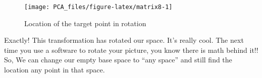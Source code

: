 \documentclass[
]{book}
\newenvironment{Shaded}{\begin{snugshade}}{\end{snugshade}}
\newcommand{\DataTypeTok}[1]{\textcolor[rgb]{0.13,0.29,0.53}{#1}}
\newcommand{\DecValTok}[1]{\textcolor[rgb]{0.00,0.00,0.81}{#1}}
\newcommand{\FloatTok}[1]{\textcolor[rgb]{0.00,0.00,0.81}{#1}}
\newcommand{\KeywordTok}[1]{\textcolor[rgb]{0.13,0.29,0.53}{\textbf{#1}}}
\newcommand{\NormalTok}[1]{#1}
\newcommand{\OperatorTok}[1]{\textcolor[rgb]{0.81,0.36,0.00}{\textbf{#1}}}
\newcommand{\StringTok}[1]{\textcolor[rgb]{0.31,0.60,0.02}{#1}}
\theoremstyle{definition}
\theoremstyle{definition}
\theoremstyle{definition}
\theoremstyle{remark}
\begin{document}
\begin{Shaded}
\begin{Highlighting}[]
{{{{{{\KeywordTok{points}\NormalTok{((b}\OperatorTok{%*%}\KeywordTok{c}\NormalTok{(}\DecValTok{4}\NormalTok{,}\DecValTok{3}\NormalTok{))[}\DecValTok{1}\NormalTok{],(b}\OperatorTok{%*%}\KeywordTok{c}\NormalTok{(}\DecValTok{4}\NormalTok{,}\DecValTok{3}\NormalTok{))[}\DecValTok{2}\NormalTok{],}\DataTypeTok{col=}\StringTok{"purple"}\NormalTok{,}\DataTypeTok{pch=}\DecValTok{7}\NormalTok{)}
\KeywordTok{arrows}\NormalTok{(}\DecValTok{0}\NormalTok{,}\DecValTok{0}\NormalTok{,(b}\OperatorTok{%*%}\KeywordTok{c}\NormalTok{(}\DecValTok{4}\NormalTok{,}\DecValTok{3}\NormalTok{))[}\DecValTok{1}\NormalTok{],(b}\OperatorTok{%*%}\KeywordTok{c}\NormalTok{(}\DecValTok{4}\NormalTok{,}\DecValTok{3}\NormalTok{))[}\DecValTok{2}\NormalTok{],}\DataTypeTok{col=}\StringTok{"purple"}\NormalTok{,}\DataTypeTok{length=}\FloatTok{0.1}\NormalTok{)}
\end{Highlighting}
\end{Shaded}

\begin{figure}

{\centering \texttt{[image: PCA\_files/figure-latex/matrix8-1]} 

}

\caption{Location of the target point in rotation}\label{fig:matrix8}
\end{figure}

Exactly! This transformation has rotated our space. It's really cool. The next time you use a software to rotate your picture, you know there is math behind it!!
So, We can change our empty base space to ``any space'' and still find the location any point in that space.
\end{document}
